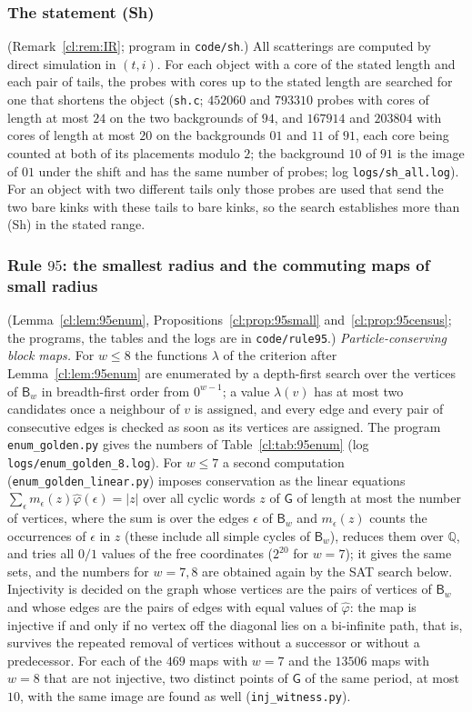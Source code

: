 \subsubsection{The statement \textup{(Sh)}}\label{app:sh} (Remark~\ref{cl:rem:IR}; program in \texttt{code/sh}.) All scatterings are computed by direct simulation in $(t,i)$. For each object with a core of the stated length and each pair of tails, the probes with cores up to the stated length are searched for one that shortens the object (\texttt{sh.c}; $452060$ and $793310$ probes with cores of length at most $24$ on the two backgrounds of $94$, and $167914$ and $203804$ with cores of length at most $20$ on the backgrounds $01$ and $11$ of $91$, each core being counted at both of its placements modulo $2$; the background $10$ of $91$ is the image of $01$ under the shift and has the same number of probes; log \texttt{logs/sh\_all.log}). For an object with two different tails only those probes are used that send the two bare kinks with these tails to bare kinks, so the search establishes more than (Sh) in the stated range.

\subsubsection{Rule $95$: the smallest radius and the commuting maps of small radius}\label{app:95} (Lemma~\ref{cl:lem:95enum}, Propositions~\ref{cl:prop:95small} and~\ref{cl:prop:95census}; the programs, the tables and the logs are in \texttt{code/rule95}.)
\emph{Particle-conserving block maps.} For $w\le8$ the functions $\lambda$ of the criterion after Lemma~\ref{cl:lem:95enum} are enumerated by a depth-first search over the vertices of $\mathsf B_w$ in breadth-first order from $0^{w-1}$; a value $\lambda(v)$ has at most two candidates once a neighbour of $v$ is assigned, and every edge and every pair of consecutive edges is checked as soon as its vertices are assigned. The program \texttt{enum\_golden.py} gives the numbers of Table~\ref{cl:tab:95enum} (log \texttt{logs/enum\_golden\_8.log}). For $w\le7$ a second computation (\texttt{enum\_golden\_linear.py}) imposes conservation as the linear equations $\sum_\epsilon m_\epsilon(z)\hat\varphi(\epsilon)=|z|$ over all cyclic words $z$ of $\mathsf G$ of length at most the number of vertices, where the sum is over the edges $\epsilon$ of $\mathsf B_w$ and $m_\epsilon(z)$ counts the occurrences of $\epsilon$ in $z$ (these include all simple cycles of $\mathsf B_w$), reduces them over $\mathbb Q$, and tries all $0/1$ values of the free coordinates ($2^{20}$ for $w=7$); it gives the same sets, and the numbers for $w=7,8$ are obtained again by the SAT search below. Injectivity is decided on the graph whose vertices are the pairs of vertices of $\mathsf B_w$ and whose edges are the pairs of edges with equal values of $\hat\varphi$: the map is injective if and only if no vertex off the diagonal lies on a bi-infinite path, that is, survives the repeated removal of vertices without a successor or without a predecessor. For each of the $469$ maps with $w=7$ and the $13506$ maps with $w=8$ that are not injective, two distinct points of $\mathsf G$ of the same period, at most $10$, with the same image are found as well (\texttt{inj\_witness.py}).

